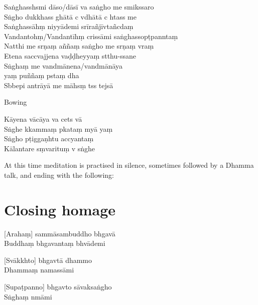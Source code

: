 \enlargethispage{\baselineskip}
\clearpage

Saṅghasshsmi dāso/dāsī va saṅgho me smikssaro\\%
Sṅgho dukkhass ghātā c vdhātā c htass me\\
Saṅghassāhṃ niyyādemi srīrañjīvtañcdaṃ\\
Vandantohṃ/Vandantīhṃ crissāmi saṅghassopṭpanntaṃ\\
Natthi me srṇaṃ aññaṃ saṅgho me srṇaṃ vraṃ\\
Etena saccvajjena vaḍḍheyyaṃ stthu-ssane\\
Sṅghaṃ me vandmānena/vandmānāya\\
\vin yaṃ puññaṃ pstaṃ dha\\
Sbbepi antrāyā me māhsṃ tss tejsā

\begin{instruction}
  Bowing
\end{instruction}

Kāyena vācāya va cets vā\\
Sṅghe kkammaṃ pkataṃ myā yaṃ\\
Sṅgho pṭiggaṇhtu accyantaṃ\\
Kālantare sṃvarituṃ v sṅghe

\vfill

\begin{instruction}
  At this time meditation is practised in silence, sometimes followed by a Dhamma talk, and ending with the following:
\end{instruction}

\chapter{Closing homage}%

[Arahaṃ] sammāsambuddho bhgavā\\
Buddhaṃ bhgavantaṃ bhvādemi 

[Svākkhto] bhgavtā dhammo\\
Dhammaṃ namassāmi 

[Supaṭpanno] bhgavto sāvaksaṅgho\\
Sṅghaṃ nmāmi 

